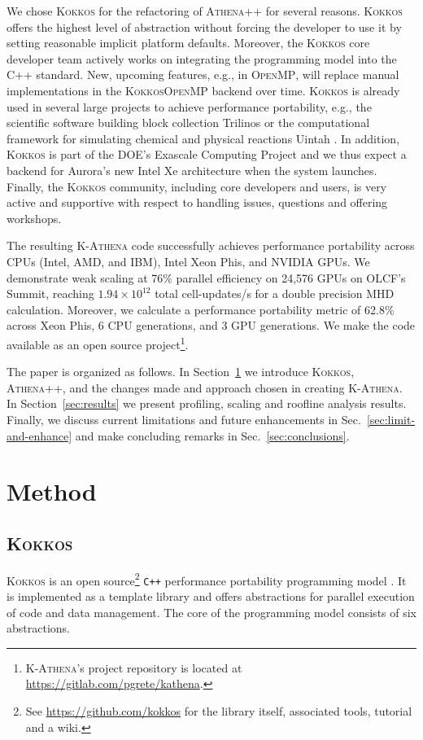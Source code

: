 \documentclass[10pt,journal,compsoc]{IEEEtran}
\newcommand{\textcode}[1]{\textsc{#1}}
\newcommand{\kokkos}{\textcode{Kokkos}\xspace}
\newcommand{\athena}{\textcode{Athena++}\xspace}
\newcommand{\kathena}{\textcode{K-Athena}\xspace}
\newcommand{\openmp}{\textcode{OpenMP}\xspace}
\newcommand{\cpp}{\textcode{C++}\xspace}
\begin{document}
We chose \kokkos for the refactoring of \athena for several reasons.
\kokkos offers the highest level of abstraction without forcing the developer to use it
by setting reasonable implicit platform defaults.
Moreover, the \kokkos core developer team actively works on integrating the 
programming model into the \cpp standard.
New, upcoming features, e.g., in \openmp, will replace manual implementations in the 
\kokkos \openmp backend over time.
\kokkos is already used in several large projects to achieve performance portability, e.g.,
the scientific software building block collection Trilinos \cite{Heroux2005} or 
the computational framework for simulating chemical and physical reactions Uintah 
\cite{Holmen2017}.
In addition, \kokkos is part of the DOE's Exascale Computing Project and we thus expect 
a backend for Aurora's new Intel Xe architecture when the system launches.
Finally, the \kokkos community, including core developers and users, is very active and
supportive with respect to handling issues, questions and offering workshops.

The resulting \kathena code successfully achieves performance portability across
CPUs (Intel, AMD, and IBM), Intel Xeon Phis, and NVIDIA GPUs.
We demonstrate weak scaling at 76\% parallel efficiency on 24,576 GPUs on OLCF's
Summit, reaching $1.94\times10^{12}$ total cell-updates/s for a double
precision MHD calculation.
Moreover, we calculate a performance portability metric of 62.8\% across Xeon Phis,
6 CPU generations, and 3 GPU generations.
We make the code available as an open source project\footnote{
\kathena's project repository is located at \url{https://gitlab.com/pgrete/kathena}.}.

The paper is organized as follows. 
In Section~\ref{sec:method} we introduce \kokkos, \athena, and the changes made 
and approach chosen in creating \kathena.
In Section~\ref{sec:results} we present profiling, scaling and roofline
analysis results.
Finally, we discuss current limitations and future enhancements in 
Sec.~\ref{sec:limit-and-enhance} and make concluding remarks in Sec.~\ref{sec:conclusions}.

\section{Method}
\label{sec:method}
\subsection{\kokkos}
\label{sec:kokkos}
\kokkos is an open source\footnote{
  See \url{https://github.com/kokkos} for the library itself, associated tools, 
  tutorial and a wiki.}
\texttt{C++} performance portability programming model 
\cite{Edwards2014}.
It is implemented as a template library and offers abstractions for parallel execution
of code and data management.
The core of the programming model consists of six abstractions.
\end{document}
